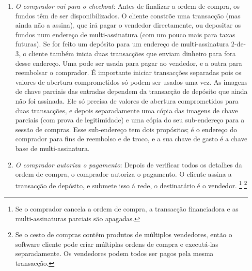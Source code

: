 \begin{enumerate}
\begin{enumerate}
\footnote{Está aberto á interpretação exactamente como um mercado online deve ser implementado. Por exemplo o tipo de pagamento pode ser apresentado ao comprador no fim, ou quando ele adiciona o produto `ao cesto'.}
A chave de ver é uma hash da chave privada do segredo partilhado entre o comprador e o vendedor. E a chave de encriptação das comunicações entre o comprador e o vendedor, é uma hash da chave de ver\footnote{Este mesmo processo aconteceria para uma multi-assinatura 1-de-2, o que exclui a necessidade de um moderador.}. 
        \item {\em O comprador vai para o checkout}: 
Antes de finalizar a ordem de compra, os fundos têm de ser disponibilizados. O cliente constrõe uma transacção (mas ainda não a assina), que irá pagar o vendedor directamente, ou depositar os fundos num endereço de multi-assinatura (com um pouco mais para taxas futuras). Se for feito um depósito para um endereço de multi-assinatura 2-de-3, o cliente também inicia duas transacções que enviam dinheiro para fora desse endereço. Uma pode ser usada para pagar ao vendedor, e a outra para reembolsar o comprador.  É importante iniciar transacções separadas pois os valores de abertura comprometidos só podem ser usados uma vez. As imagens de chave parciais das entradas dependem da transacção de depósito que ainda não foi assinada.      
Ele só precisa de valores de abertura comprometidos para duas transacções, e depois separadamente uma cópia das imagens de chave parciais (com prova de legitimidade) e uma cópia do seu sub-endereço para a sessão de compras. Esse sub-endereço tem dois propósitos; é o endereço do comprador para fins de reembolso e de troco, e a sua chave de gasto é a chave base de multi-assinatura. 
        \item {\em O comprador autoriza o pagamento}: Depois de verificar todos os detalhes da ordem de compra, o comprador autoriza o pagamento. O cliente assina a transacção de depósito, e submete isso á rede, o destinatário é o vendedor.
\footnote{Se o comprador cancela a ordem de compra, a transacção financiadora e as multi-assinaturas parciais são apagadas.}
\footnote{Se o cesto de compras contêm produtos de múltiplos vendedores, então o software cliente pode criar múltiplas ordens de compra e executá-las separadamente. Os vendedores podem todos ser pagos pela mesma transacção.}

\end{enumerate}
\end{enumerate}
